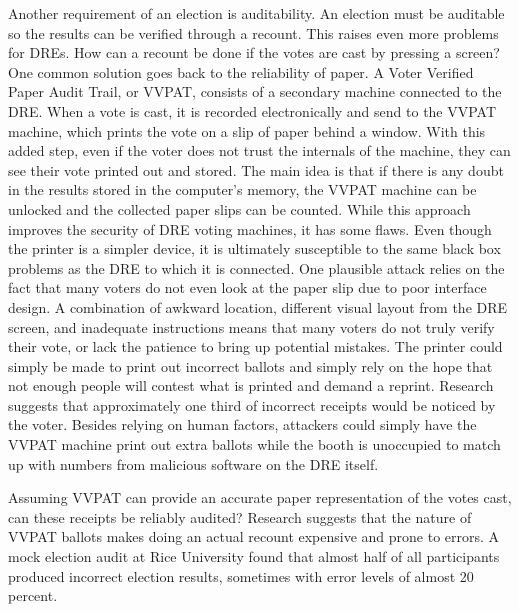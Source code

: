 \documentclass[12pt, titlepage]{article}
\begin{document}
Another requirement of an election is auditability. An election must be auditable so the results can be verified through a recount. This raises even more problems for DREs. How can a recount be done if the votes are cast by pressing a screen? One common solution goes back to the reliability of paper. A Voter Verified Paper Audit Trail, or VVPAT, consists of a secondary machine connected to the DRE. When a vote is cast, it is recorded electronically and send to the VVPAT machine, which prints the vote on a slip of paper behind a window. With this added step, even if the voter does not trust the internals of the machine, they can see their vote printed out and stored. The main idea is that if there is any doubt in the results stored in the computer's memory, the VVPAT machine can be unlocked and the collected paper slips can be counted. While this approach improves the security of DRE voting machines, it has some flaws. Even though the printer is a simpler device, it is ultimately susceptible to the same black box problems as the DRE to which it is connected. One plausible attack relies on the fact that many voters do not even look at the paper slip due to poor interface design. A combination of awkward location, different visual layout from the DRE screen, and inadequate instructions means that many voters do not truly verify their vote, or lack the patience to bring up potential mistakes. \cite{selker2004security} The printer could simply be made to print out incorrect ballots and simply rely on the hope that not enough people will contest what is printed and demand a reprint. Research suggests that approximately one third of incorrect receipts would be noticed by the voter. \cite{selker2004security} Besides relying on human factors, attackers could simply have the VVPAT machine print out extra ballots while the booth is unoccupied to match up with numbers from malicious software on the DRE itself.

Assuming VVPAT can provide an accurate paper representation of the votes cast, can these receipts be reliably audited? Research suggests that the nature of VVPAT ballots makes doing an actual recount expensive and prone to errors. A mock election audit at Rice University found that almost half of all participants produced incorrect election results, sometimes with error levels of almost 20 percent. \cite{goggin2007examination}
\end{document}
